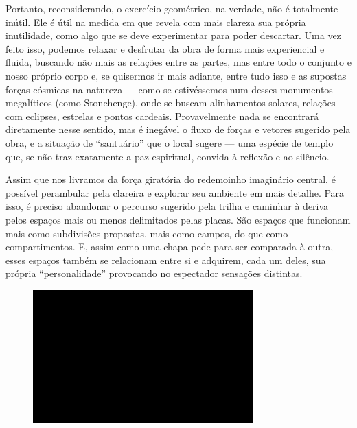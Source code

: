 Portanto, reconsiderando, o exercício geométrico, na verdade, não é
totalmente inútil. Ele é útil na medida em que revela com mais clareza
sua própria inutilidade, como algo que se deve experimentar para poder
descartar. Uma vez feito isso, podemos relaxar e desfrutar da obra de
forma mais experiencial e fluida, buscando não mais as relações entre as
partes, mas entre todo o conjunto e nosso próprio corpo e, se quisermos
ir mais adiante, entre tudo isso e as supostas forças cósmicas na
natureza --- como se estivéssemos num desses monumentos megalíticos (como
Stonehenge), onde se buscam alinhamentos solares, relações com eclipses,
estrelas e pontos cardeais. Provavelmente nada se encontrará diretamente
nesse sentido, mas é inegável o fluxo de forças e vetores sugerido pela
obra, e a situação de ``santuário'' que o local sugere --- uma espécie
de templo que, se não traz exatamente a paz espiritual, convida à
reflexão e ao silêncio.

Assim que nos livramos da força giratória do redemoinho imaginário
central, é possível perambular pela clareira e explorar seu ambiente em
mais detalhe. Para isso, é preciso abandonar o percurso sugerido pela
trilha e caminhar à deriva pelos espaços mais ou menos delimitados pelas
placas. São espaços que funcionam mais como subdivisões propostas, mais
como campos, do que como compartimentos. E, assim como uma chapa pede
para ser comparada à outra, esses espaços também se relacionam entre si
e adquirem, cada um deles, sua própria ``personalidade'' provocando no
espectador sensações distintas.

\begin{figure}[!ht]
\centering
 \includegraphics[width=85mm]{./imgs/im1.jpg}
\caption{\tiny{}}
\end{figure}

